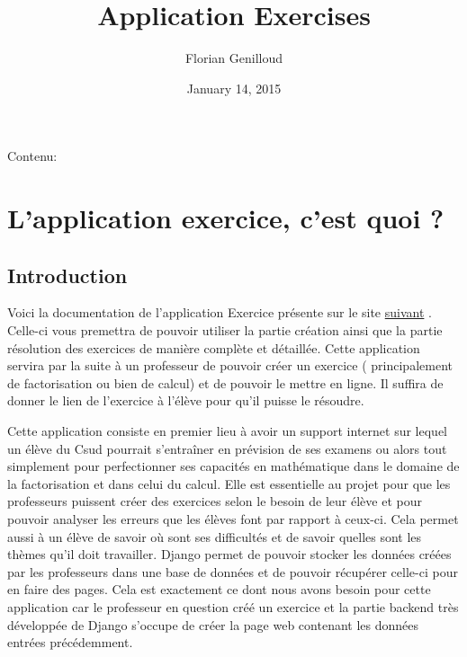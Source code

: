 \documentclass[letterpaper,10pt,english]{sphinxmanual}
\title{Application Exercises}
\date{January 14, 2015}
\author{Florian Genilloud}
\begin{document}
\maketitle
\tableofcontents
{}\label{index::doc}


Contenu:


\chapter{L'application exercice, c'est quoi ?}
\label{projet_debut:permettre-au-professeur-de-creer-un-exercice-et-a-un-eleve-de-le-resoudre}\label{projet_debut::doc}\label{projet_debut:l-application-exercice-c-est-quoi}

\section{Introduction}
\label{projet_debut:introduction}
Voici la documentation de l'application Exercice présente sur le site \href{https://webmath-thirteenfoil8.c9.io/exercises/}{suivant} . Celle-ci vous premettra de
pouvoir utiliser la partie création ainsi que la partie résolution des exercices de manière complète et détaillée. Cette application servira par la suite à un
professeur de pouvoir créer un exercice ( principalement de factorisation ou bien de calcul) et de pouvoir le mettre en ligne. Il suffira de donner le lien de
l'exercice à l'élève pour qu'il puisse le résoudre.

Cette application consiste en premier lieu à avoir un support internet sur lequel un élève du Csud pourrait s'entraîner en prévision de ses examens ou alors tout simplement
pour perfectionner ses capacités en mathématique dans le domaine de la factorisation et dans celui du calcul. Elle est essentielle au projet pour que les professeurs puissent
créer des exercices selon le besoin de leur élève et pour pouvoir analyser les erreurs que les élèves font par rapport à ceux-ci. Cela permet aussi à un élève de savoir où sont
ses difficultés et de savoir quelles sont les thèmes qu'il doit travailler. Django permet de pouvoir stocker les données créées par les
professeurs dans une base de données et de pouvoir récupérer celle-ci pour en faire des pages. Cela est exactement ce dont nous avons besoin pour cette application car le
professeur en question créé un exercice et la partie backend très développée de Django s'occupe de créer la page web contenant les données entrées précédemment.
\end{document}
